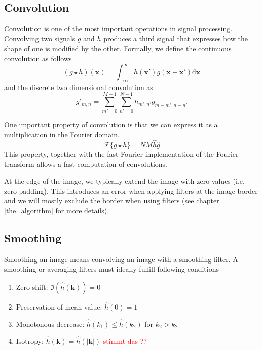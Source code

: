 		\subsection{Convolution}
		Convolution is one of the most important operations in signal processing. Convolving two signals $g$ and $h$ produces a third signal that expresses how the shape of one is modified by the other. Formally, we define the continuous convolution as follows
		\begin{equation}
			(g \star h)(\mathbf{x}) = \int_{-\infty}^{\infty} 
			h(\mathbf{x}') g(\mathbf{x} - \mathbf{x}')
			\text{d}\mathbf{x}
		\end{equation}
		and the discrete two dimensional convolution as
		\begin{equation}
			g'_{m,n} = \sum_{m'=0}^{M-1} \sum_{n'=0}^{N-1}
			h_{m',n'} g_{m-m', n-n'}
		\end{equation}
		
		One important property of convolution is that we can express it as a multiplication in the Fourier domain. 
		\begin{equation}
		\mathscr{F}\{g \star h\} = N M \hat{h} \hat{g}
		\end{equation}
		This property, together with the fast Fourier implementation of the Fourier transform allows a fast computation of convolutions. 
		
		At the edge of the image, we typically extend the image with zero values (i.e. zero padding). This introduces an error when applying filters at the image border and we will mostly exclude the border when using filters (see chapter \ref{the_algorithm} for more details).
		
		\subsection{Smoothing}\label{sect:smoothing}
		Smoothing an image means convolving an image with a smoothing filter. A smoothing or averaging filters must ideally fulfill following conditions
		\begin{enumerate}
			\item Zero-shift: $\Im (\hat{h}(\mathbf{k})) = 0$
			\item Preservation of mean value: $\hat{h}(0) = 1 $
			\item Monotonous decrease: $ \hat{h}(k_1) \leq \hat{h}(k_2) $ for $ k_2 > k_2 $
			\item Isotropy: $\hat{h}(\mathbf{k}) = \hat{h}(| \mathbf{k} |)$ \textcolor{red}{stimmt das ??}
		\end{enumerate}
		

